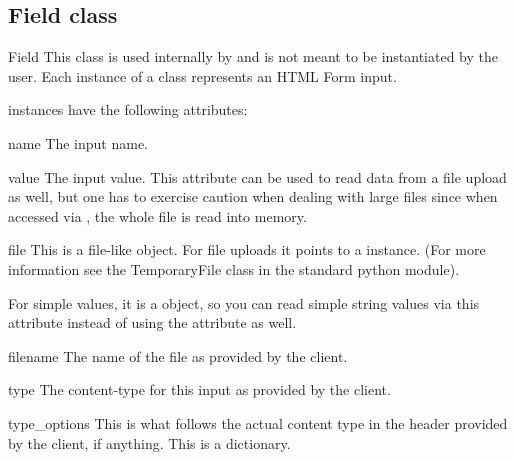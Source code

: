 \subsection{Field class\label{pyapi-util-fstor-fld}}

\begin{classdesc}{Field}{}
  This class is used internally by  and is not
  meant to be instantiated by the user. Each instance of a 
  class represents an HTML Form input.

   instances have the following attributes:

  \begin{memberdesc}{name}
    The input name.
  \end{memberdesc}

  \begin{memberdesc}{value}
    The input value. This attribute can be used to read data from a file
    upload as well, but one has to exercise caution when dealing with
    large files since when accessed via , the whole file is
    read into memory.
  \end{memberdesc}

  \begin{memberdesc}{file}
    This is a file-like object. For file uploads it points to a 
     instance. (For more information see the TemporaryFile
    class in the standard python
     module).

    For simple values, it is a  object, so you can read
    simple string values via this attribute instead of using the 
    attribute as well.
  \end{memberdesc}

  \begin{memberdesc}{filename}
    The name of the file as provided by the client.
  \end{memberdesc}

  \begin{memberdesc}{type}
    The content-type for this input as provided by the client.
  \end{memberdesc}

  \begin{memberdesc}{type_options}
    This is what follows the actual content type in the 
    header provided by the client, if anything. This is a dictionary.
  \end{memberdesc}


\end{classdesc}
